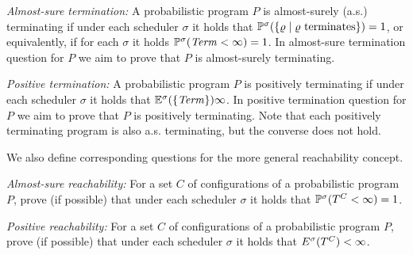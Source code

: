 \begin{compactenum}
\item \emph{Almost-sure termination:} A probabilistic program $P$ is 
almost-surely (a.s.) 
terminating if under each scheduler $\sigma$ it holds that 
$\mathbb{P}^{\sigma}(\{\varrho\mid \varrho \text{ terminates}\}) = 1$, or equivalently, 
if for each $\sigma$ it holds $\mathbb{P}^{\sigma}(\mathit{Term}<\infty)=1$. In 
almost-sure termination question for $P$ we aim to prove that $P$ 
is 
almost-surely terminating.
\item \emph{Positive termination:} A probabilistic program $P$ is 
positively
terminating if under each scheduler $\sigma$ it holds that 
$\mathbb{E}^{\sigma}(\{\mathit{Term}\}) \infty$. In 
positive termination question for $P$ we aim to prove that $P$ 
is 
positively terminating. Note that each positively terminating program is also 
a.s. terminating, but the converse does not hold.
\end{compactenum}

We also define corresponding questions for the more general reachability 
concept. 
 
\begin{compactenum}
\item \emph{Almost-sure reachability:} For a set $C$ of configurations of a
probabilistic program $P$, prove (if possible) that under each scheduler 
$\sigma$ it holds that
$\mathbb{P}^{\sigma}(T^{C}<\infty)=1$.
\item \emph{Positive reachability:} For a set $C$ of configurations of 
a probabilistic program $P$, prove (if possible) that under each scheduler 
$\sigma$ it holds that
$E^{\sigma}(T^{C})<\infty$.
\end{compactenum}

